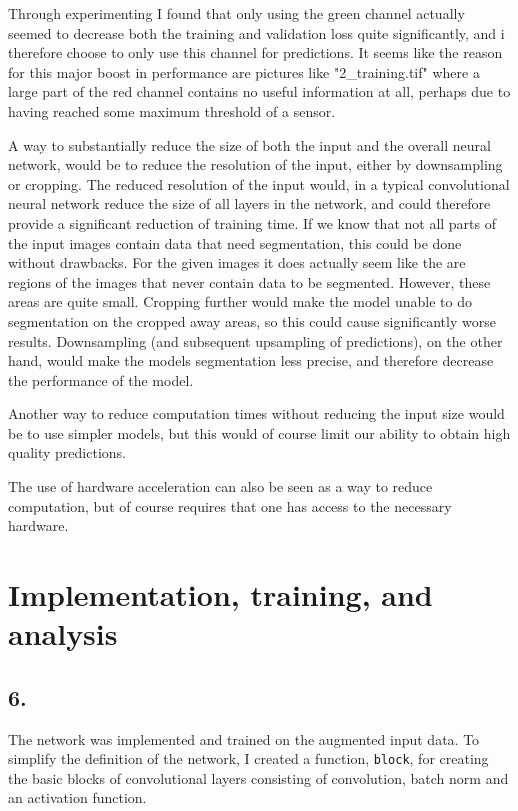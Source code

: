 \documentclass[a4paper, 12pt]{article}
\begin{document}
Through experimenting I found that only using the green channel actually seemed to decrease both the training and validation loss quite significantly, and i therefore choose to only use this channel for predictions. It seems like the reason for this major boost in performance are pictures like "2\_training.tif" where a large part of the red channel contains no useful information at all, perhaps due to having reached some maximum threshold of a sensor.

A way to substantially reduce the size of both the input and the overall neural network, would be to reduce the resolution of the input, either by downsampling or cropping. The reduced resolution of the input would, in a typical convolutional neural network reduce the size of all layers in the network, and could therefore provide a significant reduction of training time. If we know that not all parts of the input images contain data that need segmentation, this could be done without drawbacks. For the given images it does actually seem like the are regions of the images that never contain data to be segmented. However, these areas are quite small. Cropping further would make the model unable to do segmentation on the cropped away areas, so this could cause significantly worse results. Downsampling (and subsequent upsampling of predictions), on the other hand, would make the models segmentation less precise, and therefore decrease the performance of the model.

Another way to reduce computation times without reducing the input size would be to use simpler models, but this would of course limit our ability to obtain high quality predictions.

The use of hardware acceleration can also be seen as a way to reduce computation, but of course requires that one has access to the necessary hardware.

\section{Implementation, training, and analysis }

\subsection{6.}

The network was implemented and trained on the augmented input data. To simplify the definition of the network, I created a function, \texttt{block}, for creating the basic blocks of convolutional layers consisting of convolution, batch norm and an activation function.
\end{document}
